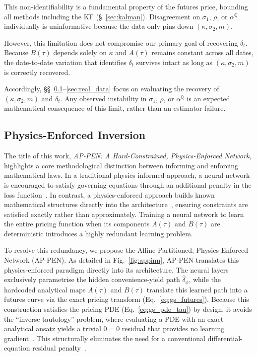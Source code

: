 \documentclass[11pt, a4paper]{article}
\newcommand{\longrun}{\alpha}               %
\begin{document}
This non-identifiability is a fundamental property of the futures price, bounding all methods including the KF (\S~\ref{sec:kalman}). Disagreement on $\sigma_1$, $\rho$, or $\longrun^{\mathbb{Q}}$ individually is uninformative because the data only pins down $(\kappa,\sigma_2,m)$.

However, this limitation does not compromise our primary goal of recovering $\delta_t$. Because $B(\tau)$ depends solely on $\kappa$ and $A(\tau)$ remains constant across all dates, the date-to-date variation that identifies $\delta_t$ survives intact as long as $(\kappa, \sigma_2, m)$ is correctly recovered. 

Accordingly, \S\S~\ref{sec:pinn_inversion}--\ref{sec:real_data} focus on evaluating the recovery of $(\kappa,\sigma_2,m)$ and $\delta_t$. Any observed instability in $\sigma_1$, $\rho$, or $\longrun^{\mathbb{Q}}$ is an expected mathematical consequence of this limit, rather than an estimator failure.

\subsection{Physics-Enforced Inversion}
\label{sec:pinn_inversion}
The title of this work, \textit{AP-PEN: A Hard-Constrained, Physics-Enforced Network}, highlights a core methodological distinction between informing and enforcing mathematical laws. In a traditional physics-informed approach, a neural network is encouraged to satisfy governing equations through an additional penalty in the loss function~\cite{Raissi2019Physics-informedEquations, Hoshisashi2024Physics-InformedPDEs}. In contrast, a physics-enforced approach builds known mathematical structures directly into the architecture~\cite{rackauckas2020universal}, ensuring constraints are satisfied exactly rather than approximately. Training a neural network to learn the entire pricing function when its components $A(\tau)$ and $B(\tau)$ are deterministic introduces a highly redundant learning problem. 

To resolve this redundancy, we propose the Affine-Partitioned, Physics-Enforced Network (AP-PEN). As detailed in Fig.~\ref{fig:appinn}, AP-PEN translates this physics-enforced paradigm directly into its architecture. The neural layers exclusively parametrise the hidden convenience-yield path $\hat{\delta}_\phi$, while the hardcoded analytical maps $A(\tau)$ and $B(\tau)$ translate this learned path into a futures curve via the exact pricing transform (Eq.~\ref{eq:gs_futures}). Because this construction satisfies the pricing PDE (Eq.~\ref{eq:gs_pde_tau}) by design, it avoids the ``inverse tautology'' problem, where evaluating a PDE with an exact analytical ansatz yields a trivial $0=0$ residual that provides no learning gradient~\cite{rackauckas2020universal}. This structurally eliminates the need for a conventional differential-equation residual penalty~\cite{lu2021deepxde}.
\end{document}
